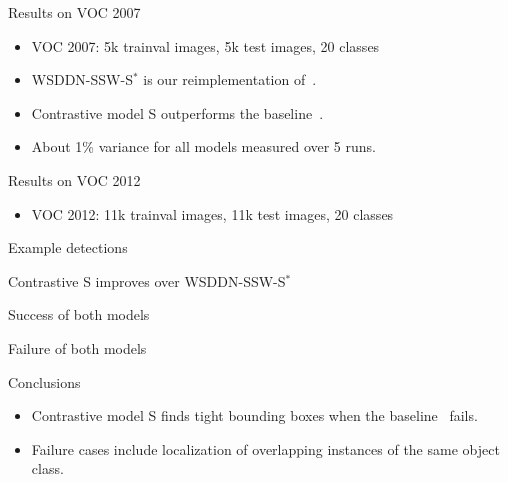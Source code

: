 \documentclass[final, xcolor={dvipsnames}]{beamer}
\begin{document}
\begin{frame}[t,fragile]{}
\begin{mdframed}[style = posterframe]
\begin{columns}[t,onlytextwidth]
\begin{column}{.26\linewidth}
	\begin{block}{Results on VOC 2007}
		{\small }
		\begin{itemize}
			\item VOC 2007: 5k trainval images, 5k test images, 20 classes
			\item WSDDN-SSW-S$^*$ is our reimplementation of~\cite{Bilen:2015uo}.
			\item Contrastive model S outperforms the baseline~\cite{Bilen:2015uo}.
			\item About 1\% variance for all models measured over 5 runs.
		\end{itemize}
	\end{block}
	
	\begin{block}{Results on VOC 2012}
		{\footnotesize }
		\begin{itemize}
			\item VOC 2012: 11k trainval images, 11k test images, 20 classes
		\end{itemize}
	\end{block}
	
	\begin{block}{Example detections}
		\begin{center}
			\footnotesize{Contrastive S improves over WSDDN-SSW-S$^*$}
			
		
			\footnotesize{Success of both models}
			
		
			\footnotesize{Failure of both models}
			
		\end{center}
	\end{block}
	
	\begin{block}{Conclusions}
		\begin{itemize}
			\item Contrastive model S finds tight bounding boxes when the baseline~\cite{Bilen:2015uo} fails.
			\item Failure cases include localization of overlapping instances of the same object class.
		\end{itemize}
	\end{block}
	

\end{column}
\end{columns}
\end{mdframed}
\end{frame}
\end{document}
